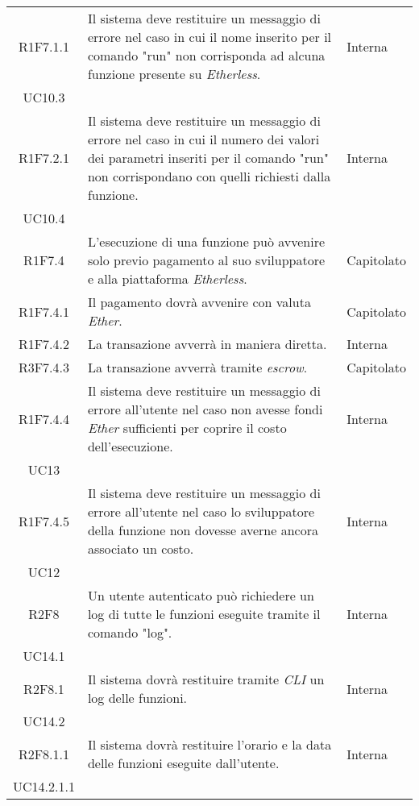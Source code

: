 \begin{longtable}{|c|p{8cm}|C{2cm}|}
	R1F7.1.1 &  Il sistema deve restituire un messaggio di errore nel caso in cui il nome inserito per il comando "run" non corrisponda ad alcuna funzione presente su \textit{Etherless}.  & \centering Interna \\ UC10.3 \tabularnewline

	R1F7.2.1 &  Il sistema deve restituire un messaggio di errore nel caso in cui il numero dei valori dei parametri inseriti per il comando "run" non corrispondano con quelli richiesti dalla funzione.  & \centering Interna \\ UC10.4 \tabularnewline

	R1F7.4 &  L'esecuzione di una funzione può avvenire solo previo pagamento al suo sviluppatore e alla piattaforma \textit{Etherless}. & Capitolato \\

	R1F7.4.1 &  Il pagamento dovrà avvenire con valuta \textit{Ether\glos}. & Capitolato \\

	R1F7.4.2 &  La transazione avverrà in maniera diretta. & Interna \\

	R3F7.4.3 &  La transazione avverrà tramite \textit{escrow\glos}. & Capitolato \\

	R1F7.4.4 &  Il sistema deve restituire un messaggio di errore all'utente nel caso non avesse fondi  \textit{Ether\glos} sufficienti per coprire il costo dell'esecuzione. & \centering Interna \\ UC13 \tabularnewline

	R1F7.4.5 &  Il sistema deve restituire un messaggio di errore all'utente nel caso lo sviluppatore della funzione non dovesse averne ancora associato un costo. & \centering Interna \\ UC12 \tabularnewline

	R2F8 &  Un utente autenticato può richiedere un log di tutte le funzioni eseguite tramite il comando "log". & \centering Interna \\ UC14.1 \tabularnewline

	R2F8.1 &  Il sistema dovrà restituire tramite \textit{CLI\glo} un log delle funzioni. & \centering Interna \\ UC14.2 \tabularnewline

	R2F8.1.1 &  Il sistema dovrà restituire l'orario e la data delle funzioni eseguite dall'utente. & \centering Interna \\ UC14.2.1.1 \tabularnewline


\end{longtable}
